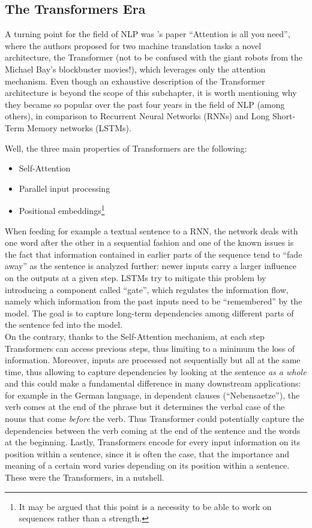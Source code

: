 \documentclass[
]{krantz}
\providecommand{\tightlist}{%
  \setlength{\itemsep}{0pt}\setlength{\parskip}{0pt}}
\begin{document}
\hypertarget{the-transformers-era}{%
\subsection{The Transformers Era}\label{the-transformers-era}}

A turning point for the field of NLP was \citet{vaswani2017attention}'s paper ``Attention is all you need'', where the authors proposed for two machine translation tasks a novel architecture, the Transformer (not to be confused with the giant robots from the Michael Bay's blockbuster movies!), which leverages only the attention mechanism. Even though an exhaustive description of the Transformer architecture is beyond the scope of this subchapter, it is worth mentioning why they became so popular over the past four years in the field of NLP (among others), in comparison to Recurrent Neural Networks (RNNs) and Long Short-Term Memory networks (LSTMs).

Well, the three main properties of Transformers are the following:

\begin{itemize}
\tightlist
\item
  Self-Attention
\item
  Parallel input processing
\item
  Positional embeddings\footnote{It may be argued that this point is a necessity to be able to work on sequences rather than a strength.}
\end{itemize}

When feeding for example a textual sentence to a RNN, the network deals with one word after the other in a sequential fashion and one of the known issues is the fact that information contained in earlier parts of the sequence tend to ``fade away'' as the sentence is analyzed further: newer inputs carry a larger influence on the outputs at a given step. LSTMs try to mitigate this problem by introducing a component called ``gate'', which regulates the information flow, namely which information from the past inputs need to be ``remembered'' by the model. The goal is to capture long-term dependencies among different parts of the sentence fed into the model.\\
On the contrary, thanks to the Self-Attention mechanism, at each step Transformers can access previous steps, thus limiting to a minimum the loss of information. Moreover, inputs are processed not sequentially but all at the same time, thus allowing to capture dependencies by looking at the sentence \emph{as a whole} and this could make a fundamental difference in many downstream applications: for example in the German language, in dependent clauses (``Nebensaetze''), the verb comes at the end of the phrase but it determines the verbal case of the nouns that come \emph{before} the verb. Thus Transformer could potentially capture the dependencies between the verb coming at the end of the sentence and the words at the beginning. Lastly, Transformers encode for every input information on its position within a sentence, since it is often the case, that the importance and meaning of a certain word varies depending on its position within a sentence. These were the Transformers, in a nutshell.
\end{document}
